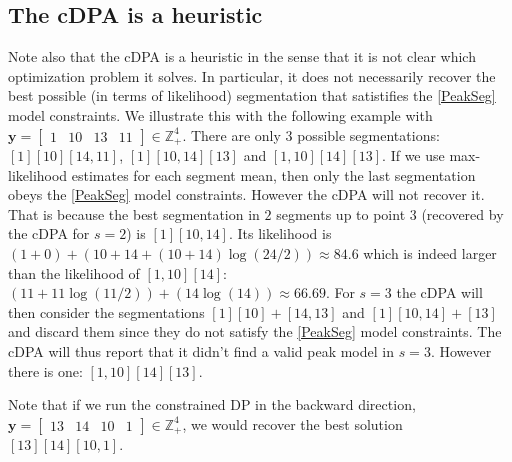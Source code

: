 \documentclass{article}
\newcommand{\ZZ}{\mathbb Z}
\begin{document}
\subsection{The cDPA is a heuristic}
\label{sec:dp-fails}

Note also that the cDPA is a heuristic in the sense that it is not
clear which optimization problem it solves.  In particular, it does
not necessarily recover the best possible (in terms of likelihood)
segmentation that satistifies the \ref{PeakSeg} model constraints.  We
illustrate this with the following example with
$\mathbf y = \left[\begin{array}{cccc} 1 & 10 & 13 & 11
\end{array}\right]\in\ZZ_+^4
$.  There are only 3 possible segmentations: $[1][10][14, 11]$,
$[1][10, 14][13]$ and $[1, 10][14][13]$.  If we use max-likelihood
estimates for each segment mean, then only the last segmentation obeys
the \ref{PeakSeg} model constraints. However the cDPA will not recover
it.  That is because the best segmentation in $2$ segments up to point
$3$ (recovered by the cDPA for $s=2$) is $[1][10, 14]$. Its likelihood
is $(1 + 0) + (10+14 + (10+14)\log(24/2)) \approx 84.6 $ which is
indeed larger than the likelihood of $[1, 10][14]$: $(11 +
11\log(11/2)) + (14\log(14)) \approx 66.69 $. For $s=3$ the cDPA will
then consider the segmentations $[1][10] + [14, 13]$ and $[1][10, 14]
+ [13]$ and discard them since they do not satisfy the \ref{PeakSeg}
model constraints. The cDPA will thus report that it didn't find a
valid peak model in $s=3$. However there is one: $[1, 10][14][13]$.

Note that if we run the constrained DP in the backward direction, 
$\mathbf y = \left[\begin{array}{cccc} 13 & 14 & 10 & 1
\end{array}\right]\in\ZZ_+^4
$, we would recover the best solution $[13][14][10, 1]$.




\end{document}
